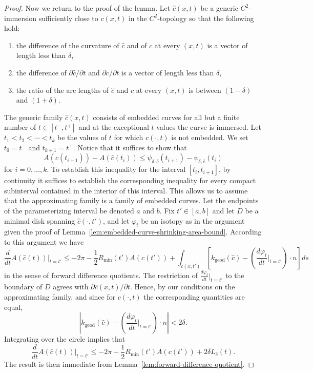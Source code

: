 \begin{proof}
Now we return to the proof of the lemma.  Let $\hat c(x,t)$ be a
generic $C^2$-immersion  sufficiently close to $c(x,t)$ in the
$C^2$-topology so that the following hold:
\begin{enumerate}
\item[(1)] the difference of the curvature of $\hat c$ and of $c$ at
every $(x,t)$ is a vector of length less than $\delta$,
\item[(2)] the difference of $\partial \hat c/\partial t$ and $\partial
c/\partial t$ is a vector of length less than $\delta$,
\item[(3)] the ratio of the arc lengths of $\hat c$ and $c$ at every
$(x,t)$ is between $(1-\delta)$ and $(1+\delta)$.
\end{enumerate}
The generic family $\hat c(x,t)$ consists of embedded curves for all
but a finite number of $t\in [t^-,t^+]$ and at the exceptional $t$
values the curve is immersed. Let $t_1<t_2<\cdots <t_k$ be the
values of $t$ for which $\hat c(\cdot,t)$ is not embedded. We set
$t_0=t^-$ and $t_{k+1}=t^+$. Notice that it suffices to show that
$$A(\hat c(t_{i+1}))-A(\hat c(t_{i}))\le
\psi_{\delta,\hat c}(t_{i+1})-\psi_{\delta,\hat c}(t_i)$$ for
$i=0,\ldots,k$. To establish this inequality for the interval
$[t_i,t_{i+1}]$,  by continuity it suffices to establish the
corresponding inequality for every compact subinterval contained in
the interior of this interval. This allows us to assume that the
approximating family is a family of embedded curves. Let the
endpoints of the parameterizing interval  be denoted $a$ and $b$.
Fix $t'\in [a,b]$ and let $D$ be a minimal disk spanning $\hat
c(\cdot, t')$, and let $\varphi_t$ be an isotopy as in the argument
given the proof of Lemma~\ref{lem:embedded-curve-shrinking-area-bound}. According to this argument
we have
$$\frac{d}{dt}A(\hat c(t))|_{t=t'}\le -2\pi -\frac{1}{2}R_\mathrm{min}(t')A(c(t'))+\int_{c(x,t')}\left[k_\mathrm{geod}(\hat
c)-\left(\frac{d\varphi_t}{dt}|_{t=t'}\right)\cdot n\right] ds$$ in
the sense of forward difference quotients. The restriction of
$\frac{d\varphi_t}{dt}|_{t=t'}$ to the boundary of $D$ agrees with
$\partial \hat c(x,t)/\partial t$. Hence, by our conditions on the
approximating family, and since for $c(\cdot,t)$ the corresponding
quantities are equal,
$$\left|k_\mathrm{geod}(\hat c)-\left(\frac{d\varphi_t}{dt}|_{t=t'}\right)\cdot
n\right|<2\delta.$$ Integrating over the circle implies that
$$\frac{d}{dt}A(\hat c(t))|_{t=t'}\le -2\pi -\frac{1}{2}R_\mathrm{min}(t')A(c(t'))+2\delta L_{\hat c}(t).$$
 The result is then
immediate from Lemma~\ref{lem:forward-difference-quotient}.
\end{proof}


